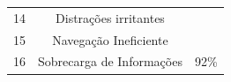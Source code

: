\begin{table}[]
\begin{tabular}{|l|c|l|l|l|l|l|}
		\multicolumn{1}{|c|}{14} & \multicolumn{5}{c|}{Distrações irritantes}                                                                 &                                                                                                                                                        \\ \cline{1-6}
		\multicolumn{1}{|c|}{15} & \multicolumn{5}{c|}{Navegação Ineficiente}                                                                 &                                                                                                                                                        \\ \cline{1-6}
		\multicolumn{1}{|c|}{16} & \multicolumn{5}{c|}{Sobrecarga de Informações}                                                             & \multirow{-16}{*}{92\%}                                                                                                                                \\ \hline
	\end{tabular}
\end{table}